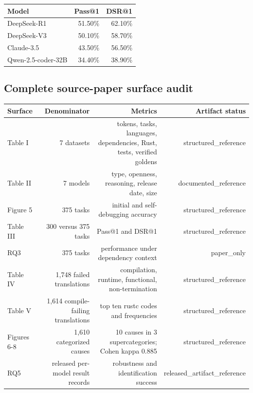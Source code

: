 \documentclass{article}
\begin{document}
\begin{tabular}{lrr}
\toprule
Model & Pass@1 & DSR@1 \\
\midrule
DeepSeek-R1 & 51.50\% & 62.10\% \\
DeepSeek-V3 & 50.10\% & 58.70\% \\
Claude-3.5 & 43.50\% & 56.50\% \\
Qwen-2.5-coder-32B & 34.40\% & 38.90\% \\
\bottomrule
\end{tabular}

\subsection*{Complete source-paper surface audit}

\begin{tabular}{lrrr}
\toprule
Surface & Denominator & Metrics & Artifact status \\
\midrule
Table I & 7 datasets & tokens, tasks, languages, dependencies, Rust, tests, verified goldens & structured\_reference \\
Table II & 7 models & type, openness, reasoning, release date, size & documented\_reference \\
Figure 5 & 375 tasks & initial and self-debugging accuracy & structured\_reference \\
Table III & 300 versus 375 tasks & Pass@1 and DSR@1 & structured\_reference \\
RQ3 & 375 tasks & performance under dependency context & paper\_only \\
Table IV & 1,748 failed translations & compilation, runtime, functional, non-termination & structured\_reference \\
Table V & 1,614 compile-failing translations & top ten rustc codes and frequencies & structured\_reference \\
Figures 6-8 & 1,610 categorized causes & 10 causes in 3 supercategories; Cohen kappa 0.885 & structured\_reference \\
RQ5 & released per-model result records & robustness and identification success & released\_artifact\_reference \\
\bottomrule
\end{tabular}
\end{document}
